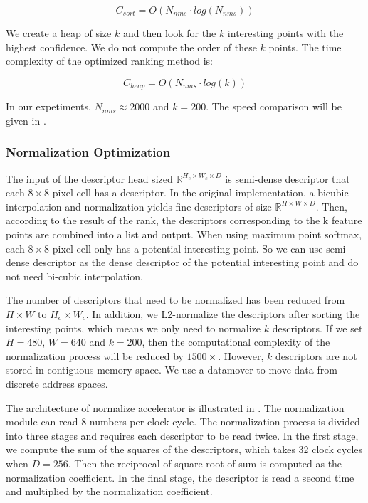 \begin{equation}
    C_{sort} = O(N_{nms} \cdot log(N_{nms}))
    \label{equ:csort}
\end{equation}

We create a heap of size $k$ and then look for the $k$ interesting points with the highest confidence. We do not compute the order of these $k$ points. The time complexity of the optimized ranking method is:

\begin{equation}
    C_{heap} = O(N_{nms} \cdot log(k))
    \label{equ:optsort}
\end{equation}

In our expetiments, $N_{nms} \approx 2000$ and $k = 200$. The speed comparison will be given in .

\subsubsection{Normalization Optimization}

The input of the descriptor head sized $\mathbb{R}^{H_c\times W_c\times D}$ is semi-dense descriptor that each $8\times8$ pixel cell has a descriptor. In the original implementation, a bicubic interpolation and normalization yields fine descriptors of size $\mathbb{R}^{H\times W\times D}$. Then, according to the result of the rank, the descriptors corresponding to the k feature points are combined into a list and output. When using maximum point softmax, each $8\times8$ pixel cell only has a potential interesting point. So we can use semi-dense descriptor as the dense descriptor of the potential interesting point and do not need bi-cubic interpolation.

The number of descriptors that need to be normalized has been reduced from $H\times W$ to $H_c\times W_c$. In addition, we L2-normalize the descriptors after sorting the interesting points, which means we only need to normalize $k$ descriptors. If we set $H=480$, $W=640$ and $k=200$, then the computational complexity of the normalization process will be reduced by $1500\times$. However, $k$ descriptors are not stored in contiguous memory space. We use a datamover to move data from discrete address spaces.

The architecture of normalize accelerator is illustrated in . The normalization module can read 8 numbers per clock cycle. The normalization process is divided into three stages and requires each descriptor to be read twice. In the first stage, we compute the sum of the squares of the descriptors, which takes 32 clock cycles when $D=256$. Then the reciprocal of square root of sum is computed as the normalization coefficient. In the final stage, the descriptor is read a second time and multiplied by the normalization coefficient.